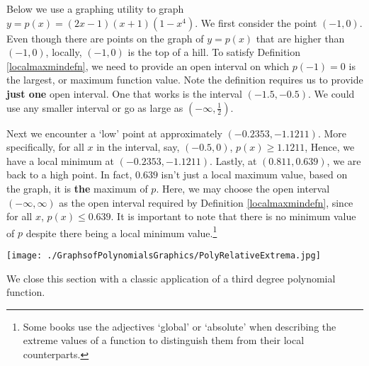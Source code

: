 \documentclass{ximera}
\begin{document}

Below we use a graphing utility to graph $y= p(x) = (2x-1)(x+1)(1-x^4)$.    We first consider the point $(-1,0)$.   Even though there are points on the graph of $y = p(x)$ that are higher than $(-1,0)$,  locally, $(-1,0)$ is the top of a hill.  To satisfy Definition \ref{localmaxmindefn}, we need to provide an open interval on which $p(-1) = 0$ is the largest, or maximum function value. Note the definition requires us to provide \textbf{just one} open interval.  One that works is the interval $(-1.5, -0.5)$.   We could use any smaller interval or go as large as $\left(-\infty, \frac{1}{2} \right)$. 


Next we encounter  a `low' point at approximately $(-0.2353, -1.1211)$. More specifically, for all $x$ in the interval, say,  $(-0.5, 0)$, $p(x) \geq 1.1211$,  Hence, we have a local minimum at $(-0.2353, -1.1211)$.   Lastly, at $(0.811, 0.639)$, we are back to a high point.  In fact, $0.639$ isn't just a local maximum value, based on the graph, it is \textbf{the} maximum of $p$.  Here, we may choose the open interval $(-\infty, \infty)$ as the open interval required by Definition \ref{localmaxmindefn}, since for all $x$, $p(x) \leq 0.639$.   It is important to note that there is no minimum value of $p$ despite there being a local minimum value.\footnote{Some books use the adjectives `global' or `absolute' when describing the extreme values of a function to distinguish them from their local counterparts.} 

\begin{center}

\label{localmaxminexample}

\texttt{[image: ./GraphsofPolynomialsGraphics/PolyRelativeExtrema.jpg]} 

\end{center}

\newpage

We close this section with a classic application of a third degree polynomial function.
\end{document}
